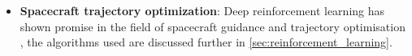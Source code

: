 \begin{itemize}



    \item \textbf{Spacecraft trajectory optimization}:
    Deep reinforcement learning has shown promise in the field of spacecraft guidance and trajectory optimisation \cite{Kolosa2019, Hovell2020}, the algorithms used are discussed further in \autoref{sec:reinforcement_learning}.
\end{itemize}
%
%





